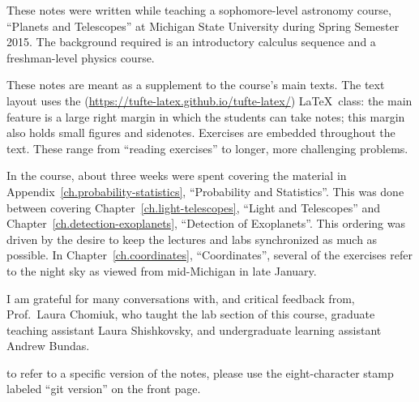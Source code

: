 
These notes were written while teaching a sophomore-level astronomy course, ``Planets and Telescopes'' at Michigan State University during Spring Semester 2015. The background required is an introductory calculus sequence and a freshman-level physics course.

These notes are meant as a supplement to the course's main texts\cite{Lissauer2013Fundamental-Pla,Bennett2013The-Cosmic-Pers}.  The text layout uses the  (\url{https://tufte-latex.github.io/tufte-latex/}) \LaTeX\ class:  the main feature is a large right margin in which the students can take notes; this margin also holds small figures and sidenotes. Exercises are embedded throughout the text.  These range from ``reading exercises'' to longer, more challenging problems.  

In the course, about three weeks were spent covering the material in Appendix~\ref{ch.probability-statistics}, ``Probability and Statistics''.  This was done between covering Chapter~\ref{ch.light-telescopes}, ``Light and Telescopes'' and Chapter~\ref{ch.detection-exoplanets}, ``Detection of Exoplanets''.  This ordering was driven by the desire to keep the lectures and labs synchronized as much as possible. In Chapter~\ref{ch.coordinates}, ``Coordinates'', several of the exercises refer to the night sky as viewed from mid-Michigan in late January.

I am grateful for many conversations with, and critical feedback from,  Prof.~Laura Chomiuk, who taught the lab section of this course, graduate teaching assistant Laura Shishkovsky, and undergraduate learning assistant Andrew Bundas. 

 to refer to a specific version of the notes, please use the eight-character stamp labeled ``git version'' on the front page.
